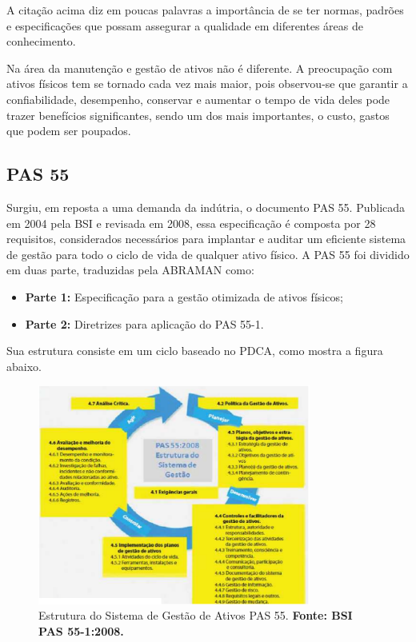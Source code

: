 A citação acima diz em poucas palavras a importância de se ter normas, padrões e especificações que possam assegurar a qualidade em diferentes áreas de conhecimento.

Na área da manutenção e gestão de ativos não é diferente. A preocupação com ativos físicos tem se tornado cada vez mais maior, pois observou-se que garantir a confiabilidade, desempenho, conservar e aumentar o tempo de vida deles pode trazer benefícios significantes, sendo um dos mais importantes, o custo, gastos que podem ser poupados.

\subsection{PAS 55}
\label{pas55}

Surgiu, em reposta a uma demanda da indútria, o documento PAS 55. Publicada em 2004 pela BSI e revisada em 2008, essa especificação é composta por 28 requisitos, considerados necessários para implantar e auditar um eficiente sistema de gestão para todo o ciclo de vida de qualquer ativo físico. A PAS 55 foi dividido em duas parte, traduzidas pela ABRAMAN como:

\begin{itemize}
	\item \textbf{Parte 1:} Especificação para a gestão otimizada de ativos físicos;
	\item \textbf{Parte 2:} Diretrizes para aplicação do PAS 55-1. 
\end{itemize} 

Sua estrutura consiste em um ciclo baseado no PDCA, como mostra a figura abaixo.

\graphicspath{{figuras/}}
\begin{figure}[h]
\centering
\includegraphics[width=0.8\textwidth]{figura1.eps}
\caption{Estrutura do Sistema de Gestão de Ativos PAS 55. \textbf{Fonte: BSI PAS 55-1:2008.}}
\label{estrututa_pas_55}
\end{figure}

